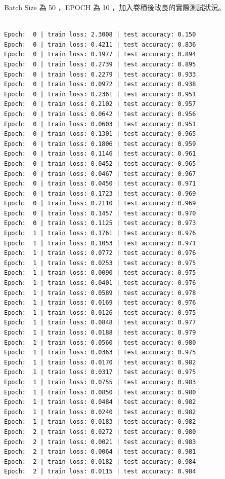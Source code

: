 \documentclass[11pt,UTF8]{ctexart}
\begin{document}
Batch Size 為 50 ，EPOCH 為 10 ，加入卷積後改良的實際測試狀況。

\begin{verbatim}

Epoch:  0 | train loss: 2.3008 | test accuracy: 0.150
Epoch:  0 | train loss: 0.4211 | test accuracy: 0.836
Epoch:  0 | train loss: 0.1977 | test accuracy: 0.894
Epoch:  0 | train loss: 0.2739 | test accuracy: 0.895
Epoch:  0 | train loss: 0.2279 | test accuracy: 0.933
Epoch:  0 | train loss: 0.0972 | test accuracy: 0.938
Epoch:  0 | train loss: 0.2361 | test accuracy: 0.951
Epoch:  0 | train loss: 0.2102 | test accuracy: 0.957
Epoch:  0 | train loss: 0.0642 | test accuracy: 0.956
Epoch:  0 | train loss: 0.0603 | test accuracy: 0.951
Epoch:  0 | train loss: 0.1301 | test accuracy: 0.965
Epoch:  0 | train loss: 0.1806 | test accuracy: 0.959
Epoch:  0 | train loss: 0.1146 | test accuracy: 0.961
Epoch:  0 | train loss: 0.0452 | test accuracy: 0.965
Epoch:  0 | train loss: 0.0467 | test accuracy: 0.967
Epoch:  0 | train loss: 0.0450 | test accuracy: 0.971
Epoch:  0 | train loss: 0.1723 | test accuracy: 0.969
Epoch:  0 | train loss: 0.2110 | test accuracy: 0.969
Epoch:  0 | train loss: 0.1457 | test accuracy: 0.970
Epoch:  0 | train loss: 0.1125 | test accuracy: 0.973
Epoch:  1 | train loss: 0.1761 | test accuracy: 0.976
Epoch:  1 | train loss: 0.1053 | test accuracy: 0.971
Epoch:  1 | train loss: 0.0772 | test accuracy: 0.976
Epoch:  1 | train loss: 0.0253 | test accuracy: 0.975
Epoch:  1 | train loss: 0.0090 | test accuracy: 0.975
Epoch:  1 | train loss: 0.0401 | test accuracy: 0.976
Epoch:  1 | train loss: 0.0589 | test accuracy: 0.978
Epoch:  1 | train loss: 0.0169 | test accuracy: 0.976
Epoch:  1 | train loss: 0.0126 | test accuracy: 0.975
Epoch:  1 | train loss: 0.0848 | test accuracy: 0.977
Epoch:  1 | train loss: 0.0188 | test accuracy: 0.979
Epoch:  1 | train loss: 0.0560 | test accuracy: 0.980
Epoch:  1 | train loss: 0.0363 | test accuracy: 0.975
Epoch:  1 | train loss: 0.0170 | test accuracy: 0.982
Epoch:  1 | train loss: 0.0317 | test accuracy: 0.975
Epoch:  1 | train loss: 0.0755 | test accuracy: 0.983
Epoch:  1 | train loss: 0.0850 | test accuracy: 0.980
Epoch:  1 | train loss: 0.0484 | test accuracy: 0.982
Epoch:  1 | train loss: 0.0240 | test accuracy: 0.982
Epoch:  1 | train loss: 0.0183 | test accuracy: 0.982
Epoch:  2 | train loss: 0.0272 | test accuracy: 0.980
Epoch:  2 | train loss: 0.0021 | test accuracy: 0.983
Epoch:  2 | train loss: 0.0064 | test accuracy: 0.981
Epoch:  2 | train loss: 0.0182 | test accuracy: 0.984
Epoch:  2 | train loss: 0.0115 | test accuracy: 0.984

\end{verbatim}
\end{document}
